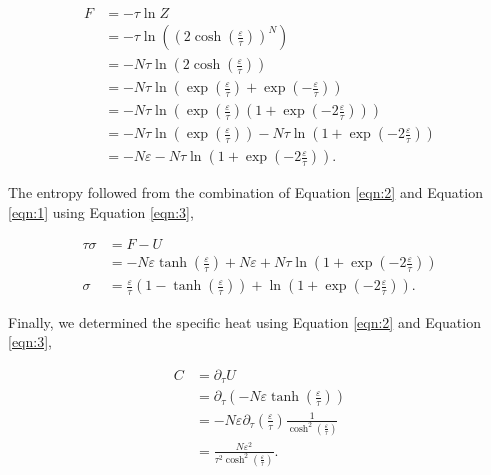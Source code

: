 \documentclass[a4paper, twocolumn]{article}
\begin{document}
\begin{align}
    F &= -\tau\ln Z \\
        &= -\tau\ln\left(\left(
            2\cosh\left(\frac{\varepsilon}{\tau}\right)\right)^{N}\right) 
            \nonumber \\
        &= -N\tau\ln\left(
            2\cosh\left(\frac{\varepsilon}{\tau}\right)\right) 
            \nonumber \\
        &= -N\tau\ln\left(
            \exp\left(\frac{\varepsilon}{\tau}\right) + 
            \exp\left(-\frac{\varepsilon}{\tau}\right)\right) \nonumber \\
        &= -N\tau\ln\left(\exp\left(\frac{\varepsilon}{\tau}\right)
            \left(1 + \exp\left(-2\frac{\varepsilon}{\tau}\right)\right)
            \right)\nonumber \\
        &= -N\tau\ln\left(\exp\left(\frac{\varepsilon}{\tau}\right)\right)
            - N\tau\ln\left(1 + 
            \exp\left(-2\frac{\varepsilon}{\tau}\right)\right) \nonumber \\
        &= -N\varepsilon - N\tau\ln\left(1 + 
            \exp\left(-2\frac{\varepsilon}{\tau}\right)\right)
    \label{eqn:3}. 
\end{align}

The entropy followed from the combination of Equation \ref{eqn:2} and %
Equation \ref{eqn:1} using Equation \ref{eqn:3},

\begin{align}
    \tau\sigma &= F - U\\
        &= -N\varepsilon\tanh\left(\frac{\varepsilon}{\tau}\right) + 
            N\varepsilon + N\tau\ln\left(1 + 
            \exp\left(-2\frac{\varepsilon}{\tau}\right)\right)\nonumber \\
    \sigma &= \frac{\varepsilon}{\tau}\left(1 - 
            \tanh\left(\frac{\varepsilon}{\tau}\right)\right) +
            \ln\left(1 + \exp\left(-2\frac{\varepsilon}{\tau}\right)\right)
    \label{eqn:4}.
\end{align} 

Finally, we determined the specific heat using Equation \ref{eqn:2} %
and Equation \ref{eqn:3},

\begin{align}
    C &= \partial_{\tau}U\\
        &= \partial_{\tau}\left(-N\varepsilon\tanh\left(
            \frac{\varepsilon}{\tau}\right)\right)\nonumber\\
        &= -N\varepsilon\partial_{\tau}\left(\frac{\varepsilon}{\tau}\right)
            \frac{1}{\cosh^{2}\left(\frac{\varepsilon}{\tau}\right)}
            \nonumber\\
        &= \frac{N\varepsilon^{2}}{\tau^{2}\cosh^{2}\left(
            \frac{\varepsilon}{\tau}\right)}
    \label{eqn:5}.
\end{align}    
\end{document}
